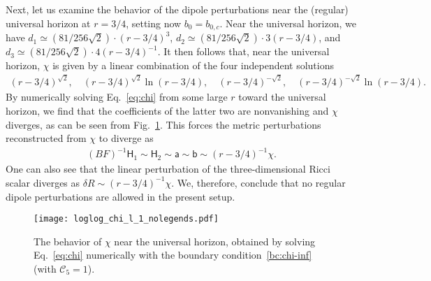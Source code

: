 \documentclass[aps,prd,preprintnumbers,superscriptaddress,nofootinbib,notitlepage]{revtex4-2}
\begin{document}
Next, let us examine the behavior of the dipole perturbations near the (regular) universal horizon at $r=3/4$, setting now $b_0=b_{0,c}$.
Near the universal horizon, we have
$d_1\simeq (81/256\sqrt{2})\cdot(r-3/4)^3$,
$d_2\simeq (81/256\sqrt{2})\cdot 3(r-3/4)$,
and $d_3\simeq (81/256\sqrt{2})\cdot 4(r-3/4)^{-1}$.
It then follows that, near the universal horizon, $\chi$ is given by a linear combination of the four independent solutions
\begin{align}
    (r-3/4)^{\sqrt{2}},
    \quad (r-3/4)^{\sqrt{2}}\ln (r-3/4),
    \quad (r-3/4)^{-\sqrt{2}},
    \quad (r-3/4)^{-\sqrt{2}}\ln (r-3/4).
\end{align}
By numerically solving Eq.~\eqref{eq:chi} from some large $r$ toward the universal horizon,
we find that the coefficients of the latter two are nonvanishing and $\chi$ diverges,
as can be seen from Fig.~\ref{fig:loglog_chi_l_1_nolegends.pdf}.
This forces the metric perturbations reconstructed from $\chi$ to diverge as
\begin{align}
    (BF)^{-1}\mathsf{H}_1\sim 
    \mathsf{H}_2\sim 
    \mathsf{a}\sim 
    \mathsf{b}\sim (r-3/4)^{-1}\chi.
\end{align}
One can also see that the linear perturbation of the three-dimensional Ricci scalar diverges as $\delta R\sim (r-3/4)^{-1}\chi$.
We, therefore, conclude that no regular dipole perturbations are allowed in the present setup.








        \begin{figure}[tb]            
                    \centering    \texttt{[image: loglog\_chi\_l\_1\_nolegends.pdf]}
                 \caption{The behavior of $\chi$ near the universal horizon,
                 obtained by solving Eq.~\eqref{eq:chi} numerically with the boundary condition~\eqref{bc:chi-inf} (with $\mathcal{C}_5=1$).}
                \label{fig:loglog_chi_l_1_nolegends.pdf}
        \end{figure}       
\end{document}
